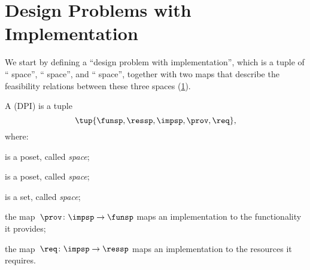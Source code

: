 

\section{Design Problems with Implementation}
\label{sec:Design-Problems}
We start by defining a ``design problem with implementation'', which is a tuple of `` space'',
`` space'', and `` space'', together with two maps that describe the feasibility relations between these three spaces (\cref{fig:setup}).

\begin{definition}
    \label{def:DPI}
    A \emph{} (DPI) is a tuple
    \begin{equation}
        \tup{\funsp, \ressp, \impsp, \prov,\req},
    \end{equation}
    where:

    \begin{compactitem}
        \item \funsp is a poset, called \emph{ space};
        \item \ressp is a poset, called \emph{ space};
        \item \impsp is a set, called \emph{ space};
        \item the map~$\prov\colon\impsp\to\funsp$
        maps an implementation to the functionality it provides;
        \item the map~$\req\colon\impsp\to\ressp$
        maps an implementation to the resources it requires.
    \end{compactitem}

\end{definition}

\begin{figure}[h]
    \begin{center}
    \end{center}
    \caption{\label{fig:setup}}
\end{figure}

